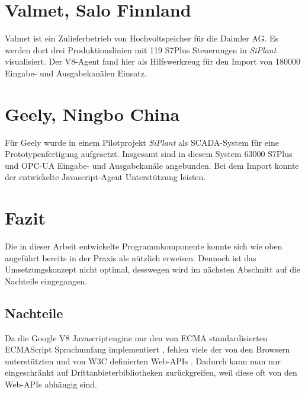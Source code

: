 \section{Valmet, Salo Finnland}

Valmet ist ein Zulieferbetrieb von Hochvoltspeicher für die Daimler AG. Es werden dort drei Produktionslinien mit 119 S7Plus Steuerungen 
in \textit{SiPlant} visualisiert. Der V8-Agent fand hier als Hilfswerkzeug für den Import von 180000 Eingabe- und Ausgabekanälen
Einsatz.

\section{Geely, Ningbo China}

Für Geely wurde in einem Pilotprojekt \textit{SiPlant} als SCADA-System für eine Prototypenfertigung aufgesetzt. 
Insgesamt sind in diesem System 63000 S7Plus und OPC-UA Eingabe- und Ausgabekanäle angebunden.
Bei dem Import konnte der entwickelte Javascript-Agent Unterstützung leisten. 

\section{Fazit}

Die in dieser Arbeit entwickelte Programmkomponente konnte sich wie oben angeführt bereits in der Praxis als nützlich erweisen. 
Dennoch ist das Umsetzungskonzept nicht optimal, desswegen wird im nächsten Abschnitt auf die Nachteile eingegangen.

\subsection{Nachteile}

Da die Google V8 Javascriptengine nur den von ECMA standardisierten ECMAScript Sprachumfang implementiert \cite{ecma}, fehlen viele 
der von den Browsern unterstützten und von W3C definierten Web-APIs \cite{webAPI}. Dadurch kann man nur eingeschränkt auf 
Drittanbieterbibliotheken zurückgreifen, weil diese oft von den Web-APIs abhängig sind. 